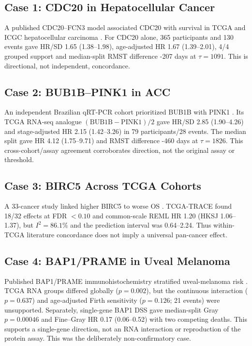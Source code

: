 \documentclass[12pt]{article}
\begin{document}
\subsection{Case 1: CDC20 in Hepatocellular Cancer}

A published CDC20--FCN3 model associated CDC20 with survival in TCGA and ICGC
hepatocellular carcinoma \citep{lai2022cdc20}. For CDC20 alone, 365 participants
and 130 events gave HR/SD 1.65 (1.38--1.98), age-adjusted HR 1.67
(1.39--2.01), 4/4 grouped support and median-split RMST difference -207 days
at \(\tau=1091\). This is directional, not independent, concordance.

\subsection{Case 2: BUB1B--PINK1 in ACC}

An independent Brazilian qRT-PCR cohort prioritized BUB1B with PINK1
\citep{fragoso2012bub1b}. Its TCGA RNA-seq analogue
\((\mathrm{BUB1B}-\mathrm{PINK1})/2\) gave HR/SD 2.85 (1.90--4.26) and
stage-adjusted HR 2.15 (1.42--3.26) in 79 participants/28 events. The median
split gave HR 4.12 (1.75--9.71) and RMST difference -460 days at
\(\tau=1826\). This cross-cohort/assay agreement corroborates direction, not
the original assay or threshold.

\subsection{Case 3: BIRC5 Across TCGA Cohorts}

A 33-cancer study linked higher BIRC5 to worse OS
\citep{faldtBeding2022birc5}. TCGA-TRACE found 18/32 effects at FDR \(<0.10\)
and common-scale REML HR 1.20 (HKSJ 1.06--1.37), but \(I^2=86.1\%\) and the
prediction interval was 0.64--2.24. Thus within-TCGA literature concordance
does not imply a universal pan-cancer effect.

\subsection{Case 4: BAP1/PRAME in Uveal Melanoma}

Published BAP1/PRAME immunohistochemistry stratified uveal-melanoma risk
\citep{han2023bap1prame}. TCGA RNA groups differed globally (\(p=0.002\)), but
the continuous interaction (\(p=0.637\)) and age-adjusted Firth sensitivity
(\(p=0.126\); 21 events) were unsupported. Separately, single-gene BAP1 DSS
gave median-split Gray \(p=0.00046\) and Fine--Gray HR 0.17 (0.06--0.52) with
two competing deaths. This supports a single-gene direction, not an RNA
interaction or reproduction of the protein assay. This was the deliberately
non-confirmatory case.
\end{document}

